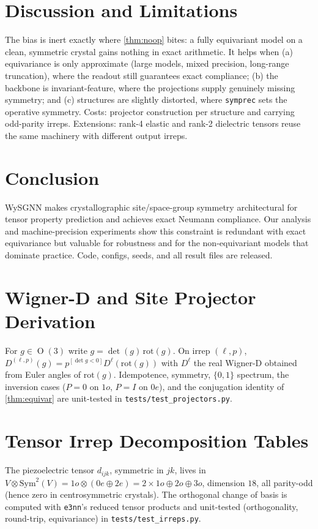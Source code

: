 \documentclass[11pt]{article}
\DeclareMathOperator{\Oo}{O}
\begin{document}
\section{Discussion and Limitations}
The bias is inert exactly where \cref{thm:noop} bites: a fully equivariant model
on a clean, symmetric crystal gains nothing in exact arithmetic. It helps when
(a) equivariance is only approximate (large models, mixed precision, long-range
truncation), where the readout still guarantees exact compliance; (b) the
backbone is invariant-feature, where the projections supply genuinely missing
symmetry; and (c) structures are slightly distorted, where \texttt{symprec} sets
the operative symmetry. Costs: projector construction per structure and carrying
odd-parity irreps. Extensions: rank-4 elastic and rank-2 dielectric tensors reuse
the same machinery with different output irreps.

\section{Conclusion}
WySGNN makes crystallographic site/space-group symmetry architectural for tensor
property prediction and achieves exact Neumann compliance. Our analysis and
machine-precision experiments show this constraint is redundant with exact
equivariance but valuable for robustness and for the non-equivariant models that
dominate practice. Code, configs, seeds, and all result files are released.

\appendix
\section{Wigner-D and Site Projector Derivation}\label{sec:wigner}
For $g\in\Oo(3)$ write $g=\det(g)\,\mathrm{rot}(g)$. On irrep $(\ell,p)$,
$D^{(\ell,p)}(g)=p^{[\det g<0]}D^\ell(\mathrm{rot}(g))$ with $D^\ell$ the real
Wigner-D obtained from Euler angles of $\mathrm{rot}(g)$. Idempotence, symmetry,
$\{0,1\}$ spectrum, the inversion cases ($P=0$ on $1o$, $P=I$ on $0e$), and the
conjugation identity of \cref{thm:equivar} are unit-tested in
\texttt{tests/test\_projectors.py}.

\section{Tensor Irrep Decomposition Tables}\label{sec:tensordecomp}
The piezoelectric tensor $d_{ijk}$, symmetric in $jk$, lives in
$V\otimes\mathrm{Sym}^2(V)=1o\otimes(0e\oplus 2e)=2\times 1o\oplus 2o\oplus 3o$,
dimension $18$, all parity-odd (hence zero in centrosymmetric crystals). The
orthogonal change of basis is computed with \texttt{e3nn}'s reduced tensor
products and unit-tested (orthogonality, round-trip, equivariance) in
\texttt{tests/test\_irreps.py}.
\end{document}
